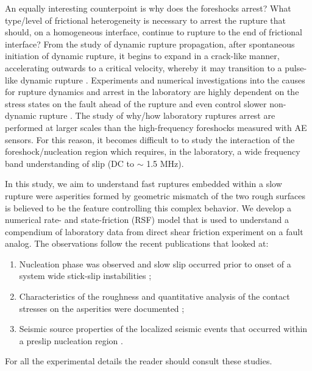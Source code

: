 \documentclass[final,3p, 11pt,authoryear]{elsarticle}
\begin{document}
An equally interesting counterpoint is why does the foreshocks arrest? What type/level of frictional heterogeneity is necessary to arrest the rupture that should, on a homogeneous interface, continue to rupture to the end of frictional interface? From the study of dynamic rupture propagation, after spontaneous initiation of dynamic rupture, it begins to expand in a crack-like manner, accelerating outwards to a critical velocity, whereby it may transition to a pulse-like dynamic rupture \citep{Heaton1990, Meier2016}. Experiments and numerical investigations into the causes for rupture dynamics and arrest in the laboratory are highly dependent on the stress states on the fault ahead of the rupture \citep{Rubinstein2004, Ben-David2010, Fineberg2015, Maegawa2010, Tromborg2011, Kammer2012, Otsuki2013, Kammer2015, Albertini2020} and even control slower non-dynamic rupture \citep{Selvadurai2017a}. The study of why/how laboratory ruptures arrest are performed at larger scales than the high-frequency foreshocks measured with AE sensors. For this reason, it becomes difficult to to study the interaction of the foreshock/nucleation region which requires, in the laboratory, a wide frequency band understanding of slip (DC to $\sim$ 1.5 MHz). 

In this study, we aim to understand fast ruptures embedded within a slow rupture were asperities formed by geometric mismatch of the two rough surfaces is believed to be the feature controlling this complex behavior. We develop a numerical rate- and state-friction (RSF) model \citep{Ampuero2008, Rubin2005} that is used to understand a compendium of laboratory data from direct shear friction experiment on a fault analog. The observations follow the recent publications that looked at:

\begin{enumerate}
\item Nucleation phase was observed and slow slip occurred prior to onset of a system wide stick-slip instabilities \citep{Selvadurai2015};
\item Characteristics of the roughness and quantitative analysis of the contact stresses on the asperities were documented \citep{Selvadurai2017};
\item Seismic source properties of the localized seismic events that occurred within a preslip nucleation region \citep{Selvadurai2019}.
\end{enumerate}

\noindent For all the experimental details the reader should consult these studies.
\end{document}
